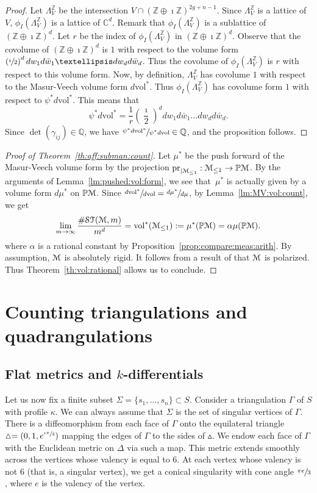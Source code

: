 \documentclass[11pt]{article}
\numberwithin{equation}{section}
\let\mathcal\EuScript
\theoremstyle{plain}
\theoremstyle{definition}
\def\C{\mathbb{C}}
\newcommand\Z{\mathbb{Z}}
\newcommand{\Q}{\mathbb{Q}}
\newcommand{\Pb}{\mathbb{P}}
\newcommand{\cM}{\mathcal{M}}
\newcommand{\ST}{\mathcal{ST}}
\newcommand{\vol}{\mathrm{vol}}
\newcommand{\pr}{\mathrm{pr}}
\let\G\Gamma
\begin{document}
\begin{proof}
Let $\Lambda^\Z_V$ be the intersection $V\cap(\Z\oplus\imath\Z)^{2g+n-1}$. Since $\Lambda^\Z_V$ is a lattice of $V$, $\phi_I(\Lambda^\Z_V)$ is a lattice of $\C^d$. Remark that $\phi_I(\Lambda^\Z_V)$ is a sublattice of $(\Z\oplus\imath\Z)^d$. Let $r$ be the index of $\phi_I(\Lambda^\Z_V)$ in $(\Z\oplus\imath\Z)^d$. Observe that the covolume of $(\Z\oplus\imath\Z)^d$ is $1$ with respect to the volume form $\left(\sfrac{\imath}{2}\right)^ddw_1d\bar{w}_1\dots dw_d d\bar{w}_d$. Thus the covolume of $\phi_I(\Lambda^\Z_V)$ is $r$ with respect to this volume form.
Now, by definition, $\Lambda^\Z_V$ has covolume $1$ with respect to the Masur-Veech volume form $d\vol^*$. Thus $\phi_I(\Lambda^\Z_V)$ has covolume form $1$ with respect to $\psi^*d\vol^*$. This means that
\[
\psi^*d\vol^*=\frac{1}{r}\left(\frac{\imath}{2}\right)^ddw_1d\bar{w}_1\dots dw_d d\bar{w}_d.
\]
Since $\det(\gamma_{ij}) \in \Q$, we have $\sfrac{\psi^*d\vol^*}{\psi^*d\vol} \in \Q$, and the proposition follows.
\end{proof}

\begin{proof}[Proof of Theorem~\ref{th:aff:subman:count}]
Let $\mu^*$ be the push forward of the Masur-Veech volume form by the projection $\pr_{|\cM_{\leq 1}}: \cM_{\leq 1} \to \Pb\cM$.
By the arguments of Lemma~\ref{lm:pushed:vol:form}, we see that~$\mu^*$ is actually given by a volume form $d\mu^*$ on $\Pb\cM$.
Since $\sfrac{d\vol^*}{d\vol}=\sfrac{d\mu^*}{d\mu}$, by Lemma~\ref{lm:MV:vol:count}, we get
\[
\lim_{m\to \infty}\frac{\#\ST(\cM,m)}{m^d}=\vol^*(\cM_{\leq1}):=\mu^*(\Pb\cM)=\alpha\mu(\Pb\cM).
\]
where $\alpha$ is a rational constant by Proposition~\ref{prop:compare:meas:arith}. By assumption, $\cM$ is absolutely rigid. It follows from a result of \cite{AEM17} that $\cM$ is polarized. Thus Theorem~\ref{th:vol:rational} allows us to conclude.
\end{proof}

\section{Counting triangulations and quadrangulations}\label{sec:count:tiling}
\subsection{Flat metrics and $k$-differentials}\label{sec:flat:kdiff}
Let us now fix a finite subset $\Sigma=\{s_1,\dots,s_n\} \subset S$. Consider a triangulation $\G$ of $S$ with profile $\kappa$. We can always assume that $\Sigma$ is the set of singular vertices of $\G$.
There is a diffeomorphism from each face of $\G$ onto the equilateral triangle $\vartriangle=(0,1,e^{\sfrac{\imath\pi}{3}})$ mapping the edges of $\G$ to the sides of $\vartriangle$.
We endow each face of $\G$ with the Euclidean metric on $\Delta$ via such a map.
This metric extends smoothly across the vertices whose valency is equal to $6$.
At each vertex whose valency is not $6$ (that is, a singular vertex), we get a conical singularity with cone angle $\sfrac{\pi e}{3}$, where $e$ is the valency of the vertex.
\end{document}
